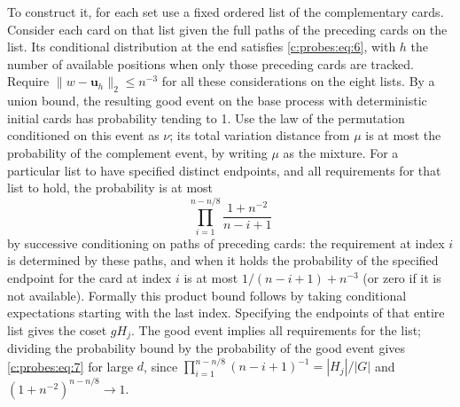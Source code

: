 To construct it, for each set use a fixed ordered list of the complementary cards. Consider
each card on that list given the full paths of the preceding cards on the list. Its conditional
distribution at the end satisfies \eqref{c:probes:eq:6}, with \(h\) the number of available positions when
only those preceding cards are tracked. Require \(\|w-\mathbf u_h\|_2\le n^{-3}\) for all these
considerations on the eight lists. By a union bound, the resulting good event on the base
process with deterministic initial cards has probability tending to 1. Use the law of the
permutation conditioned on this event as \(\nu\); its total variation distance from \(\mu\) is
at most the probability of the complement event, by writing \(\mu\) as the mixture. For a
particular list to have specified distinct endpoints, and all requirements for that list to
hold, the probability is at most
\[
\prod_{i=1}^{n-n/8}\frac{1+n^{-2}}{n-i+1}
\]
by successive conditioning on paths of preceding cards: the requirement at index \(i\) is
determined by these paths, and when it holds the probability of the specified endpoint for the
card at index \(i\) is at most \(1/(n-i+1)+n^{-3}\) (or zero if it is not available). Formally
this product bound follows by taking conditional expectations starting with the last index.
Specifying the endpoints of that entire list gives the coset \(gH_j\). The good event implies
all requirements for the list; dividing the probability bound by the probability of the good
event gives \eqref{c:probes:eq:7} for large \(d\), since \(\prod_{i=1}^{n-n/8}
(n-i+1)^{-1}=|H_j|/|G|\) and \((1+n^{-2})^{n-n/8}\to1\).

\label{c:probes:p021}

